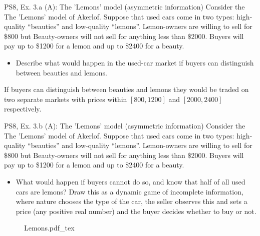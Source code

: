 \begin{frame}{PS8, Ex. 3.a (A): The 'Lemons' model (asymmetric information)}
    Consider the The 'Lemons' model of Akerlof. Suppose that used cars come in two types: high-quality “beauties” and low-quality “lemons”. Lemon-owners are willing to sell for \$800 but Beauty-owners will not sell for anything less than \$2000. Buyers will pay up to \$1200 for a lemon and up to \$2400 for a beauty.
    \begin{itemize}
      \item[(a)] Describe what would happen in the used-car market if buyers can distinguish between beauties and lemons.
    \end{itemize}
    If buyers can distinguish between beauties and lemons they would be traded on two separate markets with prices within $[800,1200]$ and $[2000,2400]$ respectively.
\end{frame}

\begin{frame}{PS8, Ex. 3.b (A): The 'Lemons' model (asymmetric information)}
    Consider the The 'Lemons' model of Akerlof. Suppose that used cars come in two types: high-quality “beauties” and low-quality “lemons”. Lemon-owners are willing to sell for \$800 but Beauty-owners will not sell for anything less than \$2000. Buyers will pay up to \$1200 for a lemon and up to \$2400 for a beauty.
    \vspace{-4pt}
    \begin{itemize}
      \item[(b)] What would happen if buyers cannot do so, and know that half of all used cars are lemons? Draw this as a dynamic game of incomplete information, where nature chooses the type of the car, the seller observes this and sets a price (any positive real number) and the buyer decides whether to buy or not.
    \end{itemize}
    \vspace{-8pt}
    \begin{figure}[!h]
      \center {}
      {Lemons.pdf_tex}
    \end{figure}
\end{frame}



